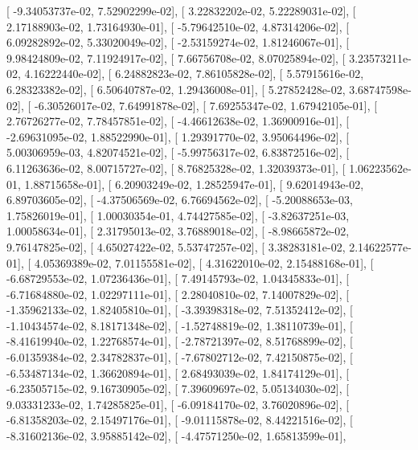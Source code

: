 \documentclass{article}
\begin{document}
       [ -9.34053737e-02,   7.52902299e-02],
       [  3.22832202e-02,   5.22289031e-02],
       [  2.17188903e-02,   1.73164930e-01],
       [ -5.79642510e-02,   4.87314206e-02],
       [  6.09282892e-02,   5.33020049e-02],
       [ -2.53159274e-02,   1.81246067e-01],
       [  9.98424809e-02,   7.11924917e-02],
       [  7.66756708e-02,   8.07025894e-02],
       [  3.23573211e-02,   4.16222440e-02],
       [  6.24882823e-02,   7.86105828e-02],
       [  5.57915616e-02,   6.28323382e-02],
       [  6.50640787e-02,   1.29436008e-01],
       [  5.27852428e-02,   3.68747598e-02],
       [ -6.30526017e-02,   7.64991878e-02],
       [  7.69255347e-02,   1.67942105e-01],
       [  2.76726277e-02,   7.78457851e-02],
       [ -4.46612638e-02,   1.36900916e-01],
       [ -2.69631095e-02,   1.88522990e-01],
       [  1.29391770e-02,   3.95064496e-02],
       [  5.00306959e-03,   4.82074521e-02],
       [ -5.99756317e-02,   6.83872516e-02],
       [  6.11263636e-02,   8.00715727e-02],
       [  8.76825328e-02,   1.32039373e-01],
       [  1.06223562e-01,   1.88715658e-01],
       [  6.20903249e-02,   1.28525947e-01],
       [  9.62014943e-02,   6.89703605e-02],
       [ -4.37506569e-02,   6.76694562e-02],
       [ -5.20088653e-03,   1.75826019e-01],
       [  1.00030354e-01,   4.74427585e-02],
       [ -3.82637251e-03,   1.00058634e-01],
       [  2.31795013e-02,   3.76889018e-02],
       [ -8.98665872e-02,   9.76147825e-02],
       [  4.65027422e-02,   5.53747257e-02],
       [  3.38283181e-02,   2.14622577e-01],
       [  4.05369389e-02,   7.01155581e-02],
       [  4.31622010e-02,   2.15488168e-01],
       [ -6.68729553e-02,   1.07236436e-01],
       [  7.49145793e-02,   1.04345833e-01],
       [ -6.71684880e-02,   1.02297111e-01],
       [  2.28040810e-02,   7.14007829e-02],
       [ -1.35962133e-02,   1.82405810e-01],
       [ -3.39398318e-02,   7.51352412e-02],
       [ -1.10434574e-02,   8.18171348e-02],
       [ -1.52748819e-02,   1.38110739e-01],
       [ -8.41619940e-02,   1.22768574e-01],
       [ -2.78721397e-02,   8.51768899e-02],
       [ -6.01359384e-02,   2.34782837e-01],
       [ -7.67802712e-02,   7.42150875e-02],
       [ -6.53487134e-02,   1.36620894e-01],
       [  2.68493039e-02,   1.84174129e-01],
       [ -6.23505715e-02,   9.16730905e-02],
       [  7.39609697e-02,   5.05134030e-02],
       [  9.03331233e-02,   1.74285825e-01],
       [ -6.09184170e-02,   3.76020896e-02],
       [ -6.81358203e-02,   2.15497176e-01],
       [ -9.01115878e-02,   8.44221516e-02],
       [ -8.31602136e-02,   3.95885142e-02],
       [ -4.47571250e-02,   1.65813599e-01],
\end{document}
